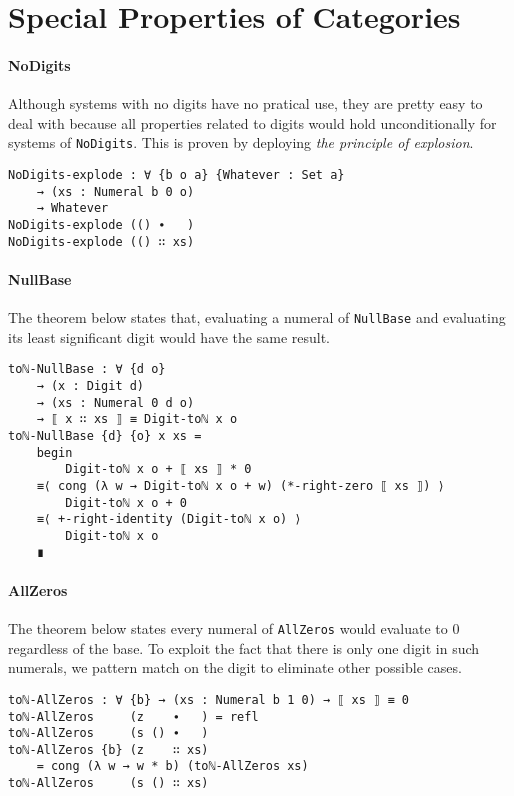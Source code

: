 \documentclass[\main/thesis.tex]{subfiles}
\begin{document}
\section{Special Properties of Categories}

\paragraph{NoDigits}

Although systems with no digits have no pratical use, they are pretty easy to deal
with because all properties related to digits would hold unconditionally for
systems of {\lstinline|NoDigits|}.
This is proven by deploying \textit{the principle of explosion}.

\begin{lstlisting}
NoDigits-explode : ∀ {b o a} {Whatever : Set a}
    → (xs : Numeral b 0 o)
    → Whatever
NoDigits-explode (() ∙   )
NoDigits-explode (() ∷ xs)
\end{lstlisting}

\paragraph{NullBase}

The theorem below states that, evaluating a numeral of {\lstinline|NullBase|}
and evaluating its least significant digit would have the same result.

\begin{lstlisting}
toℕ-NullBase : ∀ {d o}
    → (x : Digit d)
    → (xs : Numeral 0 d o)
    → ⟦ x ∷ xs ⟧ ≡ Digit-toℕ x o
toℕ-NullBase {d} {o} x xs =
    begin
        Digit-toℕ x o + ⟦ xs ⟧ * 0
    ≡⟨ cong (λ w → Digit-toℕ x o + w) (*-right-zero ⟦ xs ⟧) ⟩
        Digit-toℕ x o + 0
    ≡⟨ +-right-identity (Digit-toℕ x o) ⟩
        Digit-toℕ x o
    ∎
\end{lstlisting}

\paragraph{AllZeros}

The theorem below states every numeral of {\lstinline|AllZeros|}
would evaluate to $ 0 $ regardless of the base.
To exploit the fact that there is only one digit in such numerals, we pattern
match on the digit to eliminate other possible cases.

\begin{lstlisting}
toℕ-AllZeros : ∀ {b} → (xs : Numeral b 1 0) → ⟦ xs ⟧ ≡ 0
toℕ-AllZeros     (z    ∙   ) = refl
toℕ-AllZeros     (s () ∙   )
toℕ-AllZeros {b} (z    ∷ xs)
    = cong (λ w → w * b) (toℕ-AllZeros xs)
toℕ-AllZeros     (s () ∷ xs)
\end{lstlisting}
\end{document}
